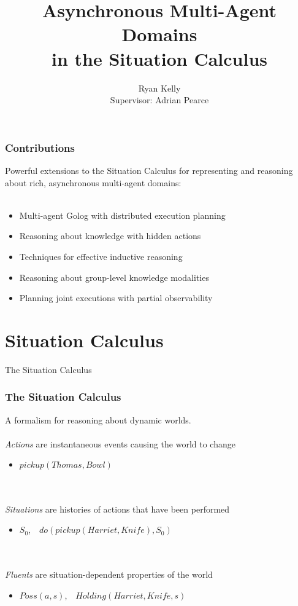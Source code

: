 \documentclass{beamer}
\title{Asynchronous Multi-Agent Domains\\ in the Situation Calculus}
\author[Ryan Kelly]{Ryan Kelly\\ Supervisor: Adrian Pearce}
\begin{document}
\begin{frame}
  \titlepage
\end{frame}

\begin{frame}
  \frametitle{Contributions}
  Powerful extensions to the Situation Calculus for representing and reasoning
  about rich, asynchronous multi-agent domains:
  \ \\
  \ \\
  \begin{itemize}
  \item Multi-agent Golog with distributed execution planning
  \item Reasoning about knowledge with hidden actions
  \item Techniques for effective inductive reasoning
  \item Reasoning about group-level knowledge modalities
  \item Planning joint executions with partial observability
  \end{itemize}
\end{frame}


\section{Situation Calculus}

\begin{frame}
\centering \large The Situation Calculus\\
\end{frame}

\begin{frame}
\frametitle{The Situation Calculus}
A formalism for reasoning about dynamic worlds.
\ \\
\ \\
\emph{Actions} are instantaneous events causing the world to change
\begin{itemize}
  \item $pickup(Thomas,Bowl)$
\end{itemize}
\ \\
\ \\
\emph{Situations} are histories of actions that have been performed
\begin{itemize}
  \item $S_0$,\ \ $do(pickup(Harriet,Knife),S_0)$
\end{itemize}
\ \\
\ \\
\emph{Fluents} are situation-dependent properties of the world
\begin{itemize}
  \item $Poss(a,s)$,\ \ $Holding(Harriet,Knife,s)$
\end{itemize}
\end{frame}
\end{document}

